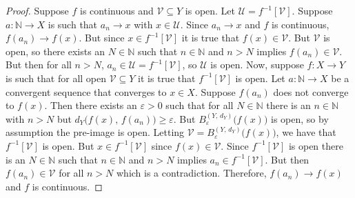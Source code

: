 \documentclass{article}
\theoremstyle{plain}
\theoremstyle{normal}
\begin{document}
        \begin{proof}
            Suppose $f$ is continuous and $\mathcal{V}\subseteq{Y}$ is open.
            Let $\mathcal{U}=f^{-1}[\mathcal{V}]$. Suppose
            $a:\mathbb{N}\rightarrow{X}$ is such that
            $a_{n}\rightarrow{x}$ with $x\in\mathcal{U}$. Since
            $a_{n}\rightarrow{x}$ and $f$ is continuous,
            $f(a_{n})\rightarrow{f}(x)$. But since $x\in{f}^{-1}[\mathcal{V}]$
            it is true that $f(x)\in\mathcal{V}$. But $\mathcal{V}$ is open, so
            there exists an $N\in\mathbb{N}$ such that $n\in\mathbb{N}$ and
            $n>N$ implies $f(a_{n})\in\mathcal{V}$. But then for all
            $n>N$, $a_{n}\in\mathcal{U}=f^{-1}[\mathcal{V}]$, so
            $\mathcal{U}$ is open. Now, suppose $f:X\rightarrow{Y}$ is such
            that for all open $\mathcal{V}\subseteq{Y}$ it is true that
            $f^{-1}[\mathcal{V}]$ is open. Let
            $a:\mathbb{N}\rightarrow{X}$ be a convergent sequence that
            converges to $x\in{X}$. Suppose
            $f(a_{n})$ does not converge to $f(x)$. Then there exists an
            $\varepsilon>0$ such that for all $N\in\mathbb{N}$ there is an
            $n\in\mathbb{N}$ with $n>N$ but
            $d_{Y}\big(f(x),\,f(a_{n})\big)\geq\varepsilon$. But
            $B_{\varepsilon}^{(Y,\,d_{Y})}\big(f(x)\big)$ is open, so by
            assumption the pre-image is open. Letting
            $\mathcal{V}=B_{\varepsilon}^{(Y,\,d_{Y})}\big(f(x)\big)$, we have
            that $f^{-1}[\mathcal{V}]$ is open. But $x\in{f}^{-1}[\mathcal{V}]$
            since $f(x)\in\mathcal{V}$. Since $f^{-1}[\mathcal{V}]$ is open
            there is an $N\in\mathbb{N}$ such that $n\in\mathbb{N}$ and
            $n>N$ implies $a_{n}\in{f}^{-1}[\mathcal{V}]$. But then
            $f(a_{n})\in\mathcal{V}$ for all $n>N$ which is a contradiction.
            Therefore, $f(a_{n})\rightarrow{f}(x)$ and $f$ is continuous.
        \end{proof}
\end{document}
